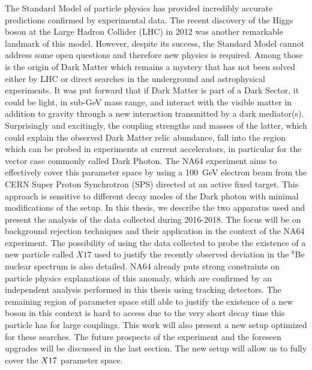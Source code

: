 The Standard Model of particle physics has provided incredibly accurate predictions confirmed by experimental data. The recent discovery of the Higgs boson at the Large Hadron Collider (LHC) in 2012 was another remarkable landmark of this model. However, despite its success, the Standard Model cannot address some open questions and therefore new physics is required. Among those is the origin of Dark Matter which remains a mystery that has not been solved either by LHC or direct searches in the underground and astrophysical experiments. It was put forward that if Dark Matter is part of a Dark Sector, it could be light, in sub-\si{\giga\electronvolt} mass range, and interact with the visible matter in addition to gravity through a new interaction transmitted by a dark mediator(s).  
Surprisingly and excitingly, the coupling strengths and masses of the latter, which could explain the observed Dark Matter relic abundance, fall into the region  which can be probed in experiments at current accelerators,  in particular for the vector case commonly called Dark Photon. The NA64 experiment aims to effectively cover this parameter space by using a \SI{100}{\giga\electronvolt} electron beam from the CERN Super Proton Synchrotron (SPS) directed at an active fixed target. This approach is sensitive to different decay modes of the Dark photon with minimal modifications of the setup. In this thesis, we describe the two apparatus used and present the analysis of the data collected during 2016-2018. The focus will be on background rejection techniques and their application in the context of the NA64 experiment. The possibility of using the data collected to probe the existence of a new particle called $X17$ used to justify the recently observed deviation in the $^8$Be nuclear spectrum is also detailed. NA64 already puts strong constraints on particle physics explanations of this anomaly, which are confirmed by an independent analysis performed in this thesis using tracking detectors. The remaining region of parameter space still able to justify the existence of a new boson in this context is hard to access due to the very short decay time this particle has for large couplings. This work will also present a new setup optimized for these searches. The future prospects of the experiment and the foreseen upgrades will be discussed in the last section. The new setup will allow us to fully cover the $X17$ parameter space.